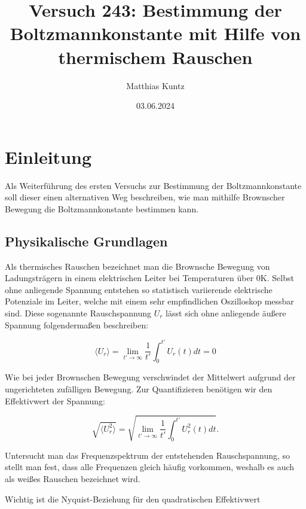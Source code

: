 \documentclass{article}
\title{Versuch 243: Bestimmung der Boltzmannkonstante mit Hilfe von thermischem Rauschen}
\author{Matthias Kuntz}
\date{03.06.2024}
\begin{document}
\maketitle

\tableofcontents

\newpage

\section{Einleitung}

Als Weiterführung des ersten Versuchs zur Bestimmung der Boltzmannkonstante soll dieser einen alternativen Weg beschreiben, wie man mithilfe Brownscher Bewegung die Boltzmannkonstante bestimmen kann.


\subsection{Physikalische Grundlagen}

Als thermisches Rauschen bezeichnet man die Brownsche Bewegung von Ladungsträgern in einem elektrischen Leiter bei Temperaturen über 0K. Selbst ohne anliegende Spannung entstehen so statistisch variierende elektrische Potenziale im Leiter, welche mit einem sehr empfindlichen Oszilloskop messbar sind. Diese sogenannte Rauschspannung $U_r$ lässt sich ohne anliegende äußere Spannung folgendermaßen beschreiben:

\begin{equation}
    \langle U_r \rangle = \lim_{t' \rightarrow \infty} \frac{1}{t'} \int_{0}^{t'} U_r(t) dt = 0
\end{equation}

Wie bei jeder Brownschen Bewegung verschwindet der Mittelwert aufgrund der ungerichteten zufälligen Bewegung. Zur Quantifizieren benötigen wir den Effektivwert der Spannung:

\begin{equation}
    \sqrt{\langle U_r^2 \rangle} = \sqrt{\lim_{t' \rightarrow \infty} \frac{1}{t'} \int_{0}^{t'} U_r^2(t) dt}.
\end{equation}

Untersucht man das Frequenzspektrum der entstehenden Rauschspannung, so stellt man fest, dass alle Frequenzen gleich häufig vorkommen, weshalb es auch als weißes Rauschen bezeichnet wird. 

Wichtig ist die Nyquist-Beziehung für den quadratischen Effektivwert
\end{document}
